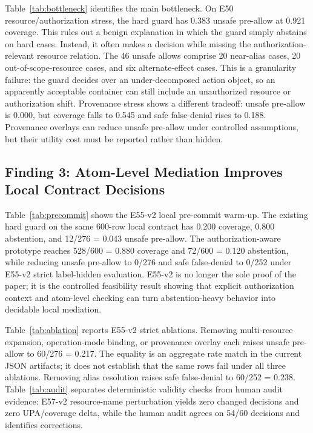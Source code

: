 Table~\ref{tab:bottleneck} identifies the main bottleneck. On E50 resource/authorization stress, the hard guard has 0.383 unsafe pre-allow at 0.921 coverage. This rules out a benign explanation in which the guard simply abstains on hard cases. Instead, it often makes a decision while missing the authorization-relevant resource relation. The 46 unsafe allows comprise 20 near-alias cases, 20 out-of-scope-resource cases, and six alternate-effect cases. This is a granularity failure: the guard decides over an under-decomposed action object, so an apparently acceptable container can still include an unauthorized resource or authorization shift. Provenance stress shows a different tradeoff: unsafe pre-allow is 0.000, but coverage falls to 0.545 and safe false-denial rises to 0.188. Provenance overlays can reduce unsafe pre-allow under controlled assumptions, but their utility cost must be reported rather than hidden.

\subsection{Finding 3: Atom-Level Mediation Improves Local Contract Decisions}





Table~\ref{tab:precommit} shows the E55-v2 local pre-commit warm-up. The existing hard guard on the same 600-row local contract has 0.200 coverage, 0.800 abstention, and 12/276 = 0.043 unsafe pre-allow. The authorization-aware prototype reaches 528/600 = 0.880 coverage and 72/600 = 0.120 abstention, while reducing unsafe pre-allow to 0/276 and safe false-denial to 0/252 under E55-v2 strict label-hidden evaluation. E55-v2 is no longer the sole proof of the paper; it is the controlled feasibility result showing that explicit authorization context and atom-level checking can turn abstention-heavy behavior into decidable local mediation.

Table~\ref{tab:ablation} reports E55-v2 strict ablations. Removing multi-resource expansion, operation-mode binding, or provenance overlay each raises unsafe pre-allow to 60/276 = 0.217. The equality is an aggregate rate match in the current JSON artifacts; it does not establish that the same rows fail under all three ablations. Removing alias resolution raises safe false-denial to 60/252 = 0.238. Table~\ref{tab:audit} separates deterministic validity checks from human audit evidence: E57-v2 resource-name perturbation yields zero changed decisions and zero UPA/coverage delta, while the human audit agrees on 54/60 decisions and identifies corrections.

